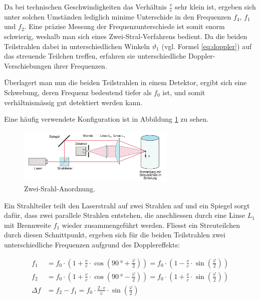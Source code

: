 Da  bei  technischen  Geschwindigkeiten das  Verh\"altnis  $\frac{v}{c}$  sehr
klein   ist,  ergeben   sich  unter   solchen  Umst\"anden   lediglich  minime
Unterschide  in   den  Frequenzen  $f_4$,  $f_1$   und  $f_2$. Eine  pr\"azise
Messung  der  Frequenzunterschiede  ist  somit enorm  schwierig,  weshalb  man
sich  eines Zwei-Stral-Verfahrens  bedient. Da die  beiden Teilstrahlen  dabei
in  unterschiedlichen  Winkeln  $\vartheta_1$  (vgl. Formel  \ref{eq:doppler})
auf   das   streuende   Teilchen  treffen,   erfahren   sie   unterschiedliche
Doppler-Verschiebungen ihrer Frequenzen.

\"Uberlagert man  nun die beiden  Teilstrahlen in einem Detektor,  ergibt sich
eine  Schwebung, deren  Frequenz bedeutend  tiefer  als $f_0$  ist, und  somit
verh\"altnism\"assig gut detektiert werden kann.

Eine     h\"aufig     verwendete     Konfiguration    ist     in     Abbildung
\ref{fig:zweistrahl-anordnung} zu sehen.

\begin{figure}[h!t]
    \centering
    \includegraphics[width=0.67\textwidth]{images/zweistrahl-anordnung.png}
    \caption{%
        Zwei-Srahl-Anordnung. \quelleVA
    }
    \label{fig:zweistrahl-anordnung}
\end{figure}

Ein Strahlteiler teilt  den Laserstrahl auf zwei Strahlen auf  und ein Spiegel
sorgt daf\"ur, dass zwei parallele  Strahlen entstehen, die anschliessen durch
eine Linse $L_1$ mit Brennweite $f_1$ wieder zusammengef\"uhrt werden. Fliesst
ein Streuteilchen durch diesen Schnittpunkt, ergeben sich f\"ur die beiden Teilstrahlen
zwei unterschiedliche Frequenzen aufgrund des Dopplereffekts:

\begin{align}
    \label{eq:splitFreqs1}
        f_1 &= f_0 \cdot
            \left(
                1 + \frac{v}{c} \cdot \cos\left( \SI{90}{\degree} + \frac{\varphi}{2} \right)
            \right)
            =
            f_0 \cdot
            \left(
                1 - \frac{v}{c} \cdot \sin\left(\frac{\varphi}{2}\right)
            \right)
            \\
        \label{eq:splitFreqs2}
        f_2 &= f_0 \cdot
            \left(
                1 + \frac{v}{c} \cdot \cos\left( \SI{90}{\degree} - \frac{\varphi}{2} \right)
            \right)
            =
            f_0 \cdot
            \left(
                1 + \frac{v}{c} \cdot \sin\left(\frac{\varphi}{2}\right)
            \right)
            \\
        \label{eq:splitFreqsDelta}
        \Delta f &= f_2 - f_1 = f_0 \cdot \frac{2 \cdot v}{c} \cdot \sin\left( \frac{\varphi}{2}\right)
\end{align}

